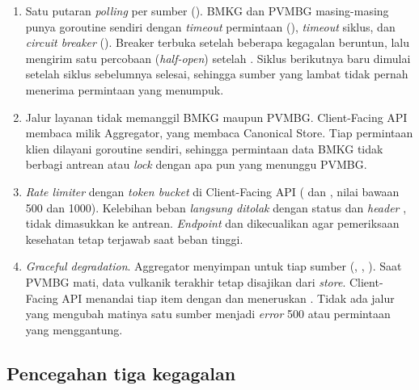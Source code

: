 \begin{enumerate}
 \item Satu putaran \emph{polling} per sumber (). BMKG dan PVMBG masing-masing punya goroutine sendiri dengan \emph{timeout} permintaan (), \emph{timeout} siklus, dan \emph{circuit breaker} (). Breaker terbuka setelah beberapa kegagalan beruntun, lalu mengirim satu percobaan (\emph{half-open}) setelah . Siklus berikutnya baru dimulai  setelah siklus sebelumnya selesai, sehingga sumber yang lambat tidak pernah menerima permintaan yang menumpuk.
 \item Jalur layanan tidak memanggil BMKG maupun PVMBG. Client-Facing API membaca  milik Aggregator, yang membaca Canonical Store. Tiap permintaan klien dilayani goroutine  sendiri, sehingga permintaan data BMKG tidak berbagi antrean atau \emph{lock} dengan apa pun yang menunggu PVMBG.
 \item \emph{Rate limiter} dengan \emph{token bucket} di Client-Facing API ( dan , nilai bawaan 500 dan 1000). Kelebihan beban \emph{langsung ditolak} dengan status  dan \emph{header} , tidak dimasukkan ke antrean. \emph{Endpoint}  dan  dikecualikan agar pemeriksaan kesehatan tetap terjawab saat beban tinggi.
 \item \emph{Graceful degradation}. Aggregator menyimpan  untuk tiap sumber (, , ). Saat PVMBG mati, data vulkanik terakhir tetap disajikan dari \emph{store}. Client-Facing API menandai tiap item dengan  dan meneruskan . Tidak ada jalur yang mengubah matinya satu sumber menjadi \emph{error} 500 atau permintaan yang menggantung.
\end{enumerate}

\subsection{Pencegahan tiga kegagalan}\label{sec:p2-tiga}

